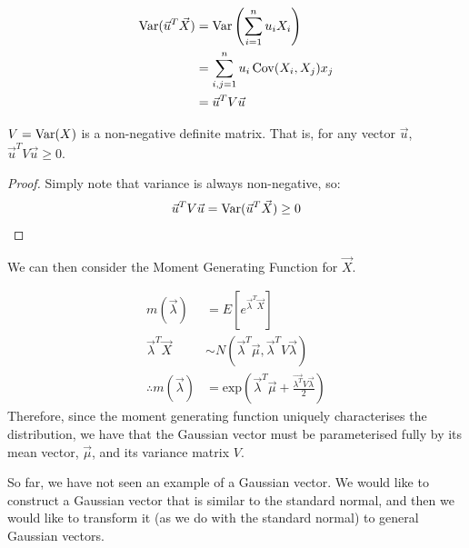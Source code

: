 \documentclass[../Main.tex]{subfiles}
\begin{document}
\begin{align*}
    \operatorname{Var}(\vec{u}^T \vec{X}) &= \operatorname{Var}\left(\sum_{i=1}^n u_i X_i\right) \\
    &= \sum_{i, j=1}^n u_i \operatorname{Cov}(X_i, X_j) x_j \\
    &= \vec{u}^T V \vec{u}
\end{align*}
\begin{proposition}
    $V = \operatorname{Var}(X)$ is a non-negative definite matrix. That is, for any vector $\vec{u}$, $\vec{u}^T V \vec{u} \geq 0$.
    \label{propVarNonNegDefinite}
\end{proposition}
\begin{proof}
    Simply note that variance is always non-negative, so:
    \begin{align*}
        \vec{u}^T V \vec{u} = \operatorname{Var}(\vec{u}^T \vec{X}) \geq 0
    \end{align*}
\end{proof}
We can then consider the Moment Generating Function for $\vec{X}$.

\begin{align*}
    m(\vec{\lambda}) &= E[e^{\vec{\lambda}^T \vec{X}}] \\
    \vec{\lambda}^T \vec{X} &\sim N(\vec{\lambda}^T \vec{\mu}, \vec{\lambda}^T V \vec{\lambda}) \\
    \therefore m(\vec{\lambda}) &= \text{exp}\left({\vec{\lambda}^T \vec{\mu} + \frac{\vec{\lambda^T} V \vec{\lambda}}{2}}\right)
\end{align*}
Therefore, since the moment generating function uniquely characterises the distribution, we have that the Gaussian vector must be parameterised fully by its mean vector, $\vec{\mu}$, and its variance matrix $V$.

So far, we have not seen an example of a Gaussian vector. We would like to construct a Gaussian vector that is similar to the standard normal, and then we would like to transform it (as we do with the standard normal) to general Gaussian vectors.
\end{document}
